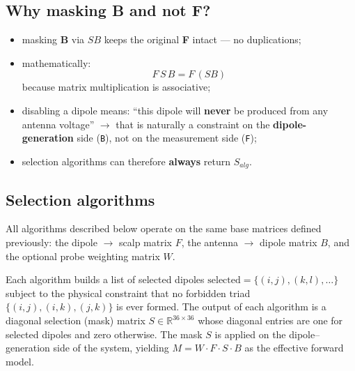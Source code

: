 \documentclass[../00_Main.tex]{subfiles}
\begin{document}
\subsection*{Why masking \textbf{B} and not \textbf{F}?}

\begin{itemize}
  \item masking \textbf{B} via $S B$ keeps the original \textbf{F} intact — no duplications;
  \item mathematically:
  \[
  F \, S \, B = F \, (S B)
  \]
  because matrix multiplication is associative;
  \item disabling a dipole means: ``this dipole will \textbf{never} be produced from any antenna voltage'' $\to$ that is naturally a constraint on the \textbf{dipole-generation} side (\texttt{B}), not on the measurement side (\texttt{F});
  \item selection algorithms can therefore \textbf{always} return $S_{alg}$.
\end{itemize}

\bigskip

\subsection{Selection algorithms}

All algorithms described below operate on the same base matrices defined previously:
the dipole $\rightarrow$ scalp matrix $F$, the antenna $\rightarrow$ dipole matrix $B$,
and the optional probe weighting matrix $W$.


Each algorithm builds a list of selected dipoles
\(\text{selected} = \{(i,j), (k,l), \dots\}\)
subject to the physical constraint that no forbidden triad
\(\{(i,j), (i,k), (j,k)\}\)
is ever formed.  
The output of each algorithm is a diagonal selection (mask) matrix \(S \in \mathbb{R}^{36\times36}\)
whose diagonal entries are one for selected dipoles and zero otherwise.
The mask \(S\) is applied on the dipole–generation side of the system,
yielding $M = W \cdot F \cdot S \cdot B$ as the effective forward model.




\biblio %
\end{document}
